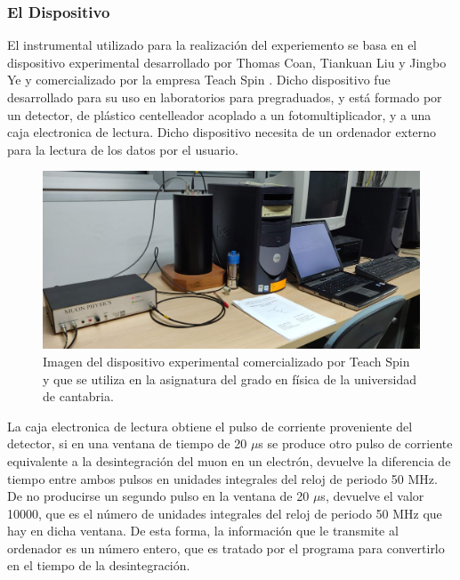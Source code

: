 \documentclass[11pt]{extarticle}
\begin{document}
				\subsubsection{El Dispositivo}
					\label{SubSubSec:PreGeneral:ConcpMet:disp}

					El instrumental utilizado para la realización del experiemento se basa en el dispositivo experimental desarrollado por Thomas Coan, Tiankuan Liu y Jingbo Ye \cite{physics/0502103} y comercializado por la empresa Teach Spin \cite{TeachSpin}. Dicho dispositivo fue desarrollado para su uso en laboratorios para pregraduados, y está formado por un detector, de plástico centelleador acoplado a un fotomultiplicador, y a una caja electronica de lectura. Dicho dispositivo necesita de un ordenador externo para la lectura de los datos por el usuario.

						\begin{figure}[H]
							\centering
							\includegraphics[scale=0.05]{Fotos/IMG_20180927_113646.jpg}
							\caption{\label{Img:widgets}Imagen del dispositivo experimental comercializado por Teach Spin y que se utiliza en la asignatura del grado en física de la universidad de cantabria.}
						\end{figure}

					La caja electronica de lectura obtiene el pulso de corriente proveniente del detector, si en una ventana de tiempo de 20 $\mu$s se produce otro pulso de corriente equivalente a la desintegración del muon en un electrón, devuelve la diferencia de tiempo entre ambos pulsos en unidades integrales del reloj de periodo 50 MHz. De no producirse un segundo pulso en la ventana de 20 $\mu$s, devuelve el valor 10000, que es el número de unidades integrales del reloj de periodo 50 MHz que hay en dicha ventana. De esta forma, la información que le transmite al ordenador es un número entero, que es tratado por el programa para convertirlo en el tiempo de la desintegración.
\end{document}
